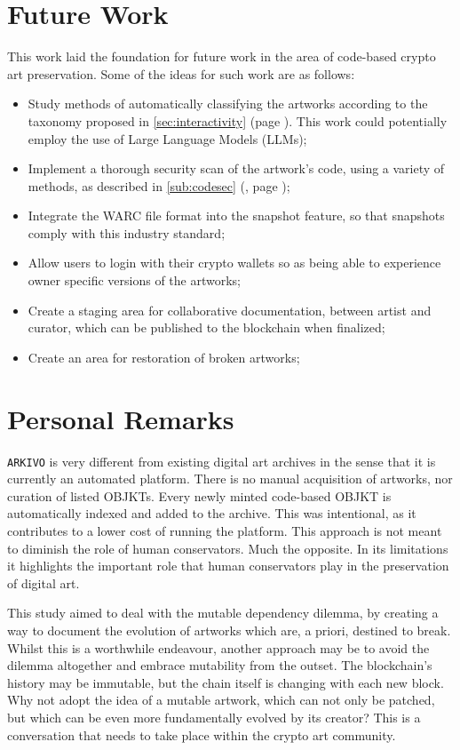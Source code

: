 \section{Future Work}

This work laid the foundation for future work in the area of code-based crypto art preservation. Some of the ideas for such work are as follows:

\begin{itemize}
	\item Study methods of automatically classifying the artworks according to the taxonomy proposed in \autoref{sec:interactivity} (page \pageref{sec:interactivity}). This work could potentially employ the use of Large Language Models (LLMs);
	\item Implement a thorough security scan of the artwork's code, using a variety of methods, as described in \autoref{sub:codesec} (, page \pageref{sub:codesec});
	\item Integrate the WARC file format into the snapshot feature, so that snapshots comply with this industry standard;
	\item Allow users to login with their crypto wallets so as being able to experience owner specific versions of the artworks;
	\item Create a staging area for collaborative documentation, between artist and curator, which can be published to the blockchain when finalized;
	\item Create an area for restoration of broken artworks;
\end{itemize}


\section{Personal Remarks}

\texttt{ARKIVO} is very different from existing digital art archives in the sense that it is currently an automated platform. There is no manual acquisition of artworks, nor curation of listed OBJKTs. Every newly minted code-based OBJKT is automatically indexed and added to the archive. This was intentional, as it contributes to a lower cost of running the platform. This approach is not meant to diminish the role of human conservators. Much the opposite. In its limitations it highlights the important role that human conservators play in the preservation of digital art.


This study aimed to deal with the mutable dependency dilemma, by creating a way to document the evolution of artworks which are, a priori, destined to break. Whilst this is a worthwhile endeavour, another approach may be to avoid the dilemma altogether and embrace mutability from the outset. The blockchain's history may be immutable, but the chain itself is changing with each new block. Why not adopt the idea of a mutable artwork, which can not only be patched, but which can be even more fundamentally evolved by its creator? This is a conversation that needs to take place within the crypto art community.

